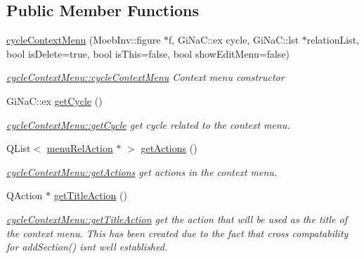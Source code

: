 \subsection*{Public Member Functions}
\begin{DoxyCompactItemize}
\item 
\mbox{\hyperlink{classcycle_context_menu_a0a948765494ab4b2ecf73c89123f7f14}{cycle\+Context\+Menu}} (Moeb\+Inv\+::figure $\ast$f, Gi\+Na\+C\+::ex cycle, Gi\+Na\+C\+::lst $\ast$relation\+List, bool is\+Delete=true, bool is\+This=false, bool show\+Edit\+Menu=false)
\begin{DoxyCompactList}\small\item\em \mbox{\hyperlink{classcycle_context_menu_a0a948765494ab4b2ecf73c89123f7f14}{cycle\+Context\+Menu\+::cycle\+Context\+Menu}} Context menu constructor \end{DoxyCompactList}\item 
Gi\+Na\+C\+::ex \mbox{\hyperlink{classcycle_context_menu_a35b3868cdc32b97e7c4abc109ee13460}{get\+Cycle}} ()
\begin{DoxyCompactList}\small\item\em \mbox{\hyperlink{classcycle_context_menu_a35b3868cdc32b97e7c4abc109ee13460}{cycle\+Context\+Menu\+::get\+Cycle}} get cycle related to the context menu. \end{DoxyCompactList}\item 
Q\+List$<$ \mbox{\hyperlink{classmenu_rel_action}{menu\+Rel\+Action}} $\ast$ $>$ \mbox{\hyperlink{classcycle_context_menu_a4dd57e4522c46a70367b6b721f23bcc9}{get\+Actions}} ()
\begin{DoxyCompactList}\small\item\em \mbox{\hyperlink{classcycle_context_menu_a4dd57e4522c46a70367b6b721f23bcc9}{cycle\+Context\+Menu\+::get\+Actions}} get actions in the context menu. \end{DoxyCompactList}\item 
Q\+Action $\ast$ \mbox{\hyperlink{classcycle_context_menu_a0e955d1a633d3585d11b7c193341a568}{get\+Title\+Action}} ()
\begin{DoxyCompactList}\small\item\em \mbox{\hyperlink{classcycle_context_menu_a0e955d1a633d3585d11b7c193341a568}{cycle\+Context\+Menu\+::get\+Title\+Action}} get the action that will be used as the title of the context menu. This has been created due to the fact that cross compatability for \textquotesingle{}add\+Section()\textquotesingle{} isn\textquotesingle{}t well established. \end{DoxyCompactList}\item 

\end{DoxyCompactItemize}
